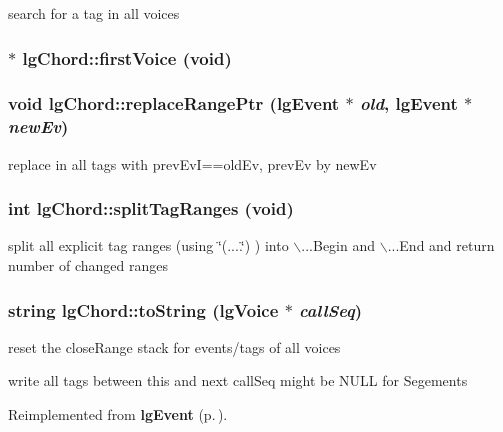 search for a tag in all voices 

\subsubsection{$\ast$ lg\-Chord::first\-Voice (void)\hspace{0.3cm}{\tt  [inline]}}\label{classlgChord_a5}


\subsubsection{\setlength{\rightskip}{0pt plus 5cm}void lg\-Chord::replace\-Range\-Ptr ({\bf lg\-Event} $\ast$ {\em old}, {\bf lg\-Event} $\ast$ {\em new\-Ev})}\label{classlgChord_a0}


replace in all tags with prev\-Ev\-I==old\-Ev, prev\-Ev by new\-Ev 

\subsubsection{\setlength{\rightskip}{0pt plus 5cm}int lg\-Chord::split\-Tag\-Ranges (void)}\label{classlgChord_a10}


split all explicit tag ranges (using \char`\"{}(....\char`\"{}) ) into $\backslash$...Begin and $\backslash$...End and return number of changed ranges 

\subsubsection{\setlength{\rightskip}{0pt plus 5cm}string lg\-Chord::to\-String ({\bf lg\-Voice} $\ast$ {\em call\-Seq})\hspace{0.3cm}{\tt  [virtual]}}\label{classlgChord_a6}


reset the close\-Range stack for events/tags of all voices 

write all tags between this and next call\-Seq might be NULL for Segements 

Reimplemented from {\bf lg\-Event} {\rm (p.\,\pageref{classlgEvent_a1})}.

